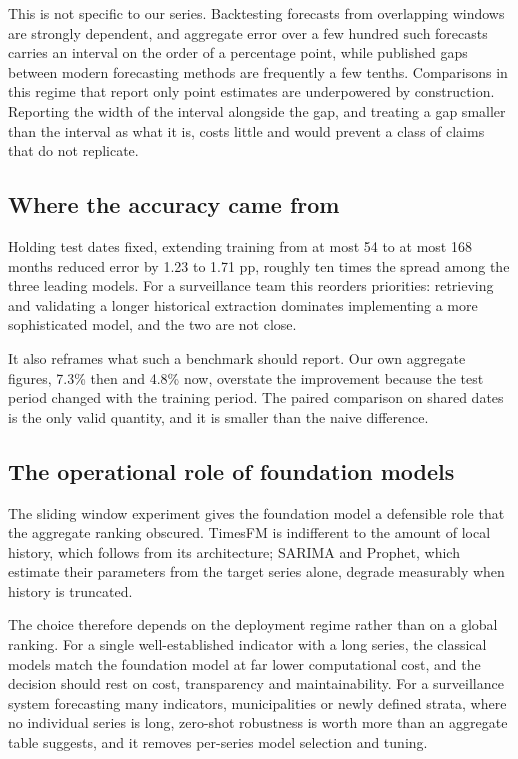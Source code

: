 This is not specific to our series. Backtesting forecasts from overlapping windows are
strongly dependent, and aggregate error over a few hundred such forecasts carries an
interval on the order of a percentage point, while published gaps between modern
forecasting methods are frequently a few tenths. Comparisons in this regime that report
only point estimates are underpowered by construction. Reporting the width of the interval
alongside the gap, and treating a gap smaller than the interval as what it is, costs little
and would prevent a class of claims that do not replicate.

\subsection{Where the accuracy came from}

Holding test dates fixed, extending training from at most 54 to at most 168 months reduced
error by 1.23 to 1.71 pp, roughly ten times the spread among the three leading models. For a surveillance
team this reorders priorities: retrieving and validating a longer historical extraction
dominates implementing a more sophisticated model, and the two are not close.

It also reframes what such a benchmark should report. Our own aggregate figures, 7.3\% then
and 4.8\% now, overstate the improvement because the test period changed with the training
period. The paired comparison on shared dates is the only valid quantity, and it is smaller
than the naive difference.

\subsection{The operational role of foundation models}

The sliding window experiment gives the foundation model a defensible role that the
aggregate ranking obscured. TimesFM is indifferent to the amount of local history, which
follows from its architecture; SARIMA and Prophet, which estimate their parameters from the
target series alone, degrade measurably when history is truncated.

The choice therefore depends on the deployment regime rather than on a global ranking. For a
single well-established indicator with a long series, the classical models match the
foundation model at far lower computational cost, and the decision should rest on cost,
transparency and maintainability. For a surveillance system forecasting many indicators,
municipalities or newly defined strata, where no individual series is long, zero-shot
robustness is worth more than an aggregate table suggests, and it removes per-series model
selection and tuning.

